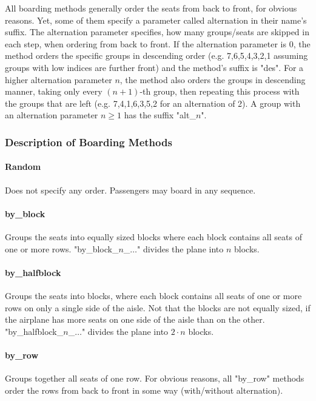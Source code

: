 \documentclass[11pt]{article}
\begin{document}
All boarding methods generally order the seats from back to front, for obvious reasons. Yet, some of them specify a parameter called alternation in their name's suffix. The alternation parameter specifies, how many groups/seats are skipped in each step, when ordering from back to front. If the alternation parameter is 0, the method orders the specific groups in descending order (e.g. 7,6,5,4,3,2,1 assuming groups with low indices are further front) and the method's suffix is "des". For a higher alternation parameter $n$, the method also orders the groups in descending manner, taking only every $(n+1)$-th group, then repeating this process with the groups that are left (e.g. 7,4,1,6,3,5,2 for an alternation of 2). A group with an alternation parameter $n \geq 1$ has the suffix "alt\_$n$".



\subsubsection{Description of Boarding Methods}

\paragraph{Random} Does not specify any order. Passengers may board in any sequence.
\paragraph{by\_block} Groups the seats into equally sized blocks where each block contains all seats of one or more rows. "by\_block\_$n$\_$\dots$" 
divides the plane into $n$ blocks.
\paragraph{by\_halfblock} Groups the seats into blocks, where each block contains all seats of one or more rows on only a single side of the aisle. Not that the blocks are not equally sized, if the airplane has more seats on one side of the aisle than on the other. "by\_halfblock\_$n$\_$\dots$" divides the plane into $2\cdot n$ blocks.

\paragraph{by\_row} Groups together all seats of one row. For obvious reasons, all "by\_row" methods order the rows from back to front in some way (with/without alternation).
\end{document}
